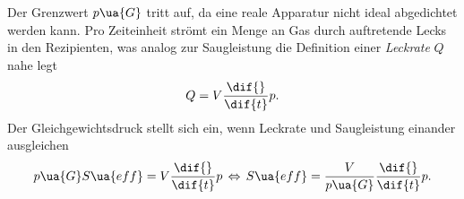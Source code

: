 Der Grenzwert $p\ua{G}$ tritt auf, da eine reale Apparatur nicht ideal abgedichtet werden kann. Pro Zeiteinheit
strömt ein Menge an Gas durch auftretende Lecks in den Rezipienten, was analog zur Saugleistung
die Definition einer \emph{Leckrate} $Q$ nahe legt
\begin{equation}
  Q = V \frac{\dif{}}{\dif{t}} p.
\end{equation}
Der Gleichgewichtsdruck stellt sich ein, wenn Leckrate und Saugleistung einander ausgleichen
\begin{equation}
  p\ua{G} S\ua{eff} =  V \frac{\dif{}}{\dif{t}} p \, \Leftrightarrow \,
  S\ua{eff} =  \frac{V}{p\ua{G}} \frac{\dif{}}{\dif{t}} p.
  \label{eq: saugvermögen_leckrate}
\end{equation}
